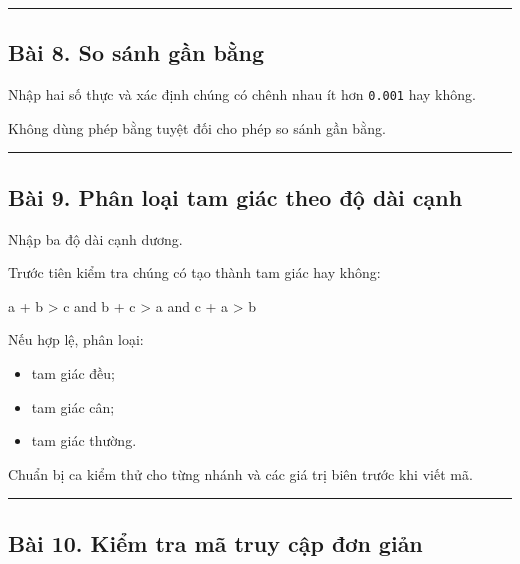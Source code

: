 \documentclass[
  11pt,
  a4paper,
]{article}
\newenvironment{Shaded}{}{}
\newcommand{\NormalTok}[1]{#1}
\providecommand{\tightlist}{%
  \setlength{\itemsep}{0pt}\setlength{\parskip}{0pt}}
\begin{document}
\begin{center}\rule{0.5\linewidth}{0.5pt}\end{center}

\subsection{Bài 8. So sánh gần
bằng}\label{buxe0i-8.-so-suxe1nh-gux1ea7n-bux1eb1ng}

Nhập hai số thực và xác định chúng có chênh nhau ít hơn \texttt{0.001}
hay không.

Không dùng phép bằng tuyệt đối cho phép so sánh gần bằng.

\begin{center}\rule{0.5\linewidth}{0.5pt}\end{center}

\subsection{Bài 9. Phân loại tam giác theo độ dài
cạnh}\label{buxe0i-9.-phuxe2n-loux1ea1i-tam-giuxe1c-theo-ux111ux1ed9-duxe0i-cux1ea1nh}

Nhập ba độ dài cạnh dương.

Trước tiên kiểm tra chúng có tạo thành tam giác hay không:

\begin{Shaded}
\begin{Highlighting}[]
\NormalTok{a + b \textgreater{} c}
\NormalTok{and}
\NormalTok{b + c \textgreater{} a}
\NormalTok{and}
\NormalTok{c + a \textgreater{} b}
\end{Highlighting}
\end{Shaded}

Nếu hợp lệ, phân loại:

\begin{itemize}
\tightlist
\item
  tam giác đều;
\item
  tam giác cân;
\item
  tam giác thường.
\end{itemize}

Chuẩn bị ca kiểm thử cho từng nhánh và các giá trị biên trước khi viết
mã.

\begin{center}\rule{0.5\linewidth}{0.5pt}\end{center}

\subsection{Bài 10. Kiểm tra mã truy cập đơn
giản}\label{buxe0i-10.-kiux1ec3m-tra-muxe3-truy-cux1eadp-ux111ux1a1n-giux1ea3n}
\end{document}

